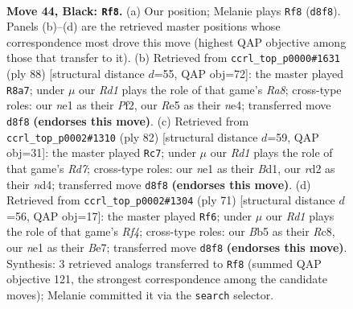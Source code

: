 \documentclass[11pt]{article}
\begin{document}
\clearpage

\begin{figure}[p]\centering
\begin{subfigure}{0.46\textwidth}\centering
\resizebox{\linewidth}{!}{%
\newchessgame
\chessboard[
  setfen={3r4/5B2/2k2N2/1b2rp2/1P5R/8/3R2P1/3KN3 b - - 4 44},
  showmover=false,
  pgfstyle=straightmove, color=movearrow, markmove={d8-f8}
]}
\caption{}
\end{subfigure}\hfill
\begin{subfigure}{0.46\textwidth}\centering
\resizebox{\linewidth}{!}{%
\newchessgame
\chessboard[
  setfen={R4rk1/5p2/R5p1/pr6/4n1P1/8/5PK1/B7 w - - 1 45},
  showmover=false,
  pgfstyle=straightmove, color=movearrow, markmove={a8-a7}
]}
\caption{}
\end{subfigure}
\\[4pt]
\begin{subfigure}{0.46\textwidth}\centering
\resizebox{\linewidth}{!}{%
\newchessgame
\chessboard[
  setfen={6k1/3R1p2/5P2/5bpP/3n4/2pr4/5K2/2RB4 w - - 1 42},
  showmover=false,
  pgfstyle=straightmove, color=movearrow, markmove={d7-c7}
]}
\caption{}
\end{subfigure}\hfill
\begin{subfigure}{0.46\textwidth}\centering
\resizebox{\linewidth}{!}{%
\newchessgame
\chessboard[
  setfen={2r1k3/R3b3/3pp2p/5r2/5N2/5R2/1PP3P1/1K6 b - - 4 36},
  showmover=false,
  pgfstyle=straightmove, color=movearrow, markmove={f5-f6}
]}
\caption{}
\end{subfigure}
\caption{\textbf{Move 44, Black: \texttt{Rf8}.} (a) Our position; Melanie plays \texttt{Rf8} (\texttt{d8f8}). Panels (b)--(d) are the retrieved master positions whose correspondence most drove this move (highest QAP objective among those that transfer to it). (b) Retrieved from \texttt{ccrl\_top\_p0000\#1631} (ply 88) [structural distance $d$=55, QAP obj=72]: the master played \texttt{R8a7}; under $\mu$ our \emph{Rd1} plays the role of that game's \emph{Ra8}; cross-type roles: our \emph{n}e1 as their \emph{P}f2, our \emph{R}e5 as their \emph{n}e4; transferred move \texttt{d8f8} \textbf{(endorses this move)}. (c) Retrieved from \texttt{ccrl\_top\_p0002\#1310} (ply 82) [structural distance $d$=59, QAP obj=31]: the master played \texttt{Rc7}; under $\mu$ our \emph{Rd1} plays the role of that game's \emph{Rd7}; cross-type roles: our \emph{n}e1 as their \emph{B}d1, our \emph{r}d2 as their \emph{n}d4; transferred move \texttt{d8f8} \textbf{(endorses this move)}. (d) Retrieved from \texttt{ccrl\_top\_p0002\#1304} (ply 71) [structural distance $d$=56, QAP obj=17]: the master played \texttt{Rf6}; under $\mu$ our \emph{Rd1} plays the role of that game's \emph{Rf4}; cross-type roles: our \emph{B}b5 as their \emph{R}c8, our \emph{n}e1 as their \emph{B}e7; transferred move \texttt{d8f8} \textbf{(endorses this move)}. Synthesis: 3 retrieved analogs transferred to \texttt{Rf8} (summed QAP objective 121, the strongest correspondence among the candidate moves); Melanie committed it via the \texttt{search} selector.}
\label{fig:thought-m87}
\end{figure}
\end{document}
